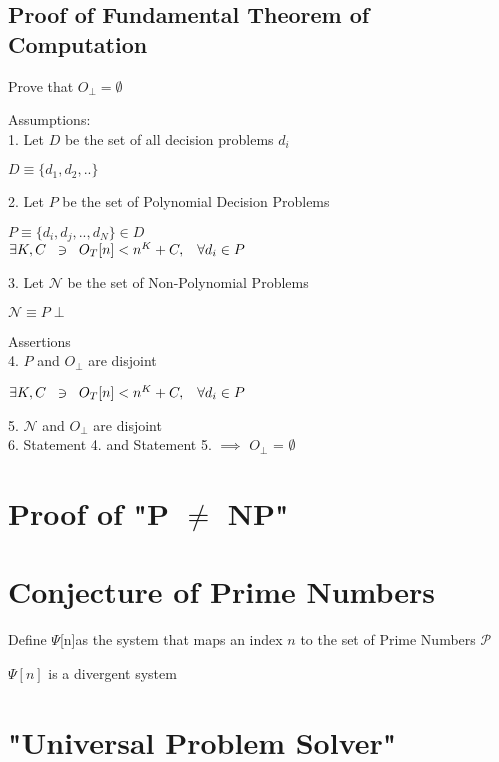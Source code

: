 \documentclass[11pt]{article}
\begin{document}
\subsection{Proof of Fundamental Theorem of Computation}
Prove that $O_\perp = \emptyset$

Assumptions:\\
1. Let $D$ be the set of all decision problems $d_i$\\
\begin{center}
$
D \equiv \{d_1,d_2,..\}
$
\end{center}
\vspace{3mm}
2. Let $P$ be the set of Polynomial Decision Problems\\
\begin{center}
$
P \equiv \{ d_i,d_j,..,d_N \} \in D
$\\
$ 
\exists K,C\hspace{2mm} \ni \hspace{2mm} O_T[n] < n^K + C, \hspace{3mm} \forall d_i \in P
$
\end{center}
\vspace{3mm}
3. Let $\mathcal{N}$ be the set of Non-Polynomial Problems\\
\begin{center}
$
\mathcal{N} \equiv P\perp
$
\end{center}
\vspace{10mm}
Assertions\\
4. $P$ and $O_\perp$ are disjoint
\begin{center}
$ 
\exists K,C\hspace{2mm} \ni \hspace{2mm} O_T[n] < n^K + C, \hspace{3mm} \forall d_i \in P
$
\end{center}
\vspace{3mm}
5. $\mathcal{N}$ and $O_\perp$ are disjoint\\
6. Statement 4. and Statement 5. $\implies$ $O_\perp$ = $\emptyset$


\section{Proof of "P $\neq$ NP"}

\section{Conjecture of Prime Numbers}
Define $\Psi$[n]as the system that maps an index $n$ to the set of Prime Numbers $\mathcal{P}$
\begin{center}
$\Psi[n]$ is a divergent system
\end{center}

\section{"Universal Problem Solver"}
\end{document}
